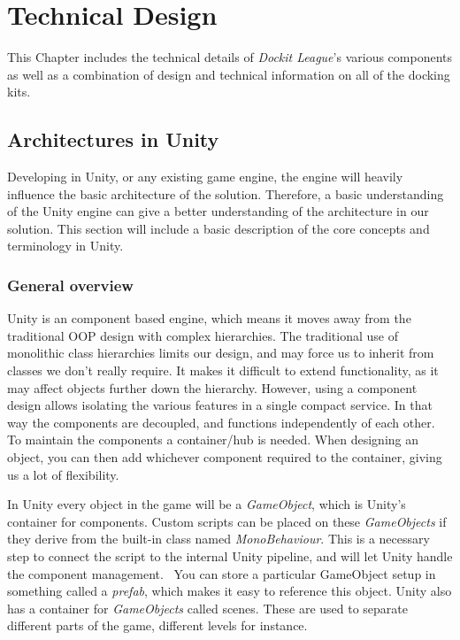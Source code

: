 \chapter{Technical Design}
\label{chap:technical}

This Chapter includes the technical details of \emph{Dockit League}'s various components as well as a combination of design and technical information on all of the docking kits.  

\section{Architectures in Unity}
Developing in Unity, or any existing game engine, the engine will heavily influence the basic architecture of the solution. Therefore, a basic understanding of the Unity engine can give a better understanding of the architecture in our solution. This section will include a basic description of the core concepts and terminology in Unity.

\subsection{General overview}
Unity is an component based engine, which means it moves away from the traditional OOP design with complex hierarchies. The traditional use of monolithic class hierarchies limits our design, and may force us to inherit from classes we don't really require. It makes it difficult to extend functionality, as it may affect objects further down the hierarchy. However, using a component design allows isolating the various features in a single compact service. In that way the components are decoupled, and functions independently of each other. To maintain the components a container/hub is needed. When designing an object, you can then add whichever component required to the container, giving us a lot of flexibility.~\cite{gameEngineArch}

In Unity every object in the game will be a \emph{GameObject}, which is Unity's container for components. Custom scripts can be placed on these \emph{GameObjects} if they derive from the built-in class named \emph{MonoBehaviour}. This is a necessary step to connect the script to the internal Unity pipeline, and will let Unity handle the component management.~\cite{unityScriptManual} You can store a particular GameObject setup in something called a \emph{prefab}, which makes it easy to reference this object. Unity also has a container for \emph{GameObjects} called scenes. These are used to separate different parts of the game, different levels for instance.

